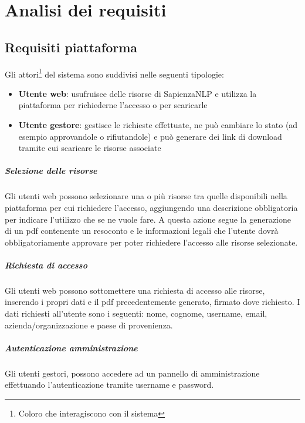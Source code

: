 
\chapter{Analisi dei requisiti}


\section{Requisiti piattaforma}
Gli attori\footnote{Coloro che interagiscono con il sistema} del sistema
sono suddivisi nelle seguenti tipologie:
\begin{itemize}
	\item \textbf{Utente web}: usufruisce delle risorse di SapienzaNLP e utilizza
	la piattaforma per richiederne l'accesso o per scaricarle
	\item \textbf{Utente gestore}: gestisce le richieste effettuate, ne
	può cambiare lo stato (ad esempio approvandole o rifiutandole) e può generare
	dei link di download tramite cui scaricare le risorse associate
\end{itemize}

\paragraph{Selezione delle risorse}
Gli utenti web possono selezionare una o più risorse tra quelle disponibili nella
piattaforma per cui richiedere l'accesso, aggiungendo una descrizione obbligatoria
per indicare l'utilizzo che se ne vuole fare. A questa azione segue la generazione
di un pdf contenente un resoconto e le informazioni legali che l'utente dovrà
obbligatoriamente approvare per poter richiedere l'accesso alle risorse selezionate.

\paragraph{Richiesta di accesso} \label{par:access-request}
Gli utenti web possono sottomettere una richiesta di accesso alle risorse, inserendo
i propri dati e il pdf precedentemente generato, firmato dove richiesto.
I dati richiesti all'utente sono i seguenti: nome, cognome, username, email,
azienda/organizzazione e paese di provenienza.

\paragraph{Autenticazione amministrazione}
Gli utenti gestori, possono accedere ad un pannello di amministrazione
effettuando l'autenticazione tramite username e password.

